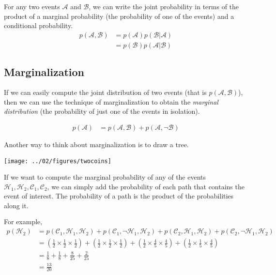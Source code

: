 \documentclass{tufte-handout}
\begin{document}
For any two events $\mathcal{A}$ and $\mathcal{B}$, we can write the joint probability in terms of the product of a marginal probability (the probability of one of the events) and a conditional probability.
\begin{align}
p(\mathcal{A}, \mathcal{B}) &= p(\mathcal{A}) p( \mathcal{B} | \mathcal{A})  \\
&= p(\mathcal{B}) p( \mathcal{A} | \mathcal{B})
\end{align}


\subsection{Marginalization}
If we can easily compute the joint distribution of two events (that is $p(\mathcal{A}, \mathcal{B})$), then we can use the technique of marginalization to obtain the \emph{marginal distribution} (the probability of just one of the events in isolation).

\begin{align}
p(\mathcal{A}) &= p(\mathcal{A}, \mathcal{B}) + p(\mathcal{A}, \neg \mathcal{B})
\end{align}


Another way to think about marginalization is to draw a tree.

\begin{center}
\texttt{[image: ../02/figures/twocoins]}
\end{center}

If we want to compute the marginal probability of any of the events $\mathcal{H}_1, \mathcal{H}_2, \mathcal{C}_1, \mathcal{C}_2$, we can simply add the probability of each path that contains the event of interest.  The probability of a path is the product of the probabilities along it.

For example,
\begin{align}
p(\mathcal{H}_2) &= p(\mathcal{C}_1, \mathcal{H}_1, \mathcal{H}_2) + p(\mathcal{C}_1, \neg \mathcal{H}_1, \mathcal{H}_2) + p(\mathcal{C}_2, \mathcal{H}_1, \mathcal{H}_2) + p(\mathcal{C}_2, \neg \mathcal{H}_1, \mathcal{H}_2) \nonumber \\
&= \left ( \frac{1}{2} \times \frac{1}{2} \times \frac{1}{2} \right) + \left ( \frac{1}{2} \times \frac{1}{2} \times \frac{1}{2} \right) + \left ( \frac{1}{2} \times \frac{4}{5} \times \frac{4}{5} \right) + \left ( \frac{1}{2} \times \frac{1}{5} \times \frac{4}{5} \right) \nonumber \\
&= \frac{1}{8} + \frac{1}{8} + \frac{8}{25} + \frac{2}{25} \nonumber \\
&= \frac{13}{20} \nonumber
\end{align}
\end{document}
